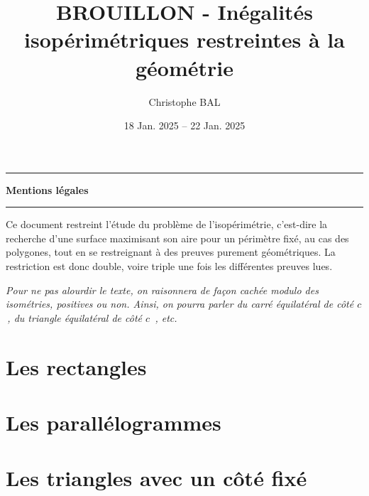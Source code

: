 \documentclass[12pt]{amsart}
\begin{document}
\title{BROUILLON - Inégalités isopérimétriques restreintes à la géométrie}
\author{Christophe BAL}
\date{18 Jan. 2025 -- 22 Jan. 2025}
\maketitle


\begin{center}
	\hrule\vspace{.3em}
	{
		\fontsize{1.35em}{1em}\selectfont
		\textbf{Mentions \og légales \fg}
	}
			
	\vspace{0.45em}
	\doclicenseThis
	\hrule
\end{center}



\setcounter{tocdepth}{2}
\tableofcontents




\newpage

Ce document restreint l'étude du problème de l'isopérimétrie, c'est-dire la recherche d'une surface maximisant son aire pour un périmètre fixé, au cas des polygones, tout en se restreignant à des preuves purement géométriques. La restriction est donc double, voire triple une fois les différentes preuves lues.


\begin{tcolorbox}
	\itshape\small
	Pour ne pas alourdir le texte, on raisonnera de façon cachée modulo des isométries, positives ou non. Ainsi, on pourra parler \og \emph{du carré équilatéral de côté $c$} \fg\,, \og \emph{du triangle équilatéral de côté $c$} \fg\,, etc.
\end{tcolorbox}




\section{Les rectangles}






\section{Les parallélogrammes}






\section{Les triangles avec un côté fixé}
\end{document}
